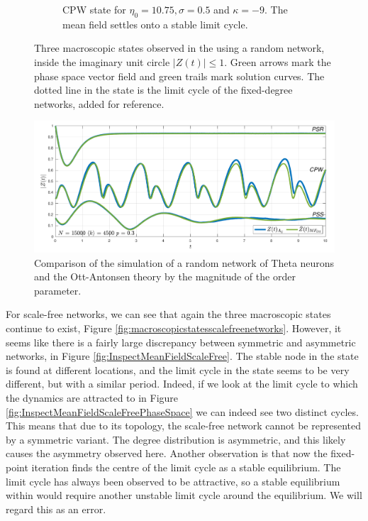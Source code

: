 \begin{figure}[H]
\begin{subfigure}[b]{0.32\linewidth}
   \caption{CPW state for $\eta_0 = 10.75, \sigma = 0.5$ and $\kappa= -9$. The mean field settles onto a stable limit cycle.}
   \label{fig:MFOARCPW_random}
\end{subfigure}
   \caption{Three macroscopic states observed in the \MFR using a random network, inside the imaginary unit circle $|Z(t)| \leqslant 1$. Green arrows mark the phase space vector field and green trails mark solution curves. The dotted line in the \CPW state is the limit cycle of the fixed-degree networks, added for reference.}
   \label{fig:macroscopicstatesrandomnetworks}
\end{figure}

\begin{figure}[H]
\centering
\includegraphics[width = \textwidth, trim={0 3mm 0 3mm},clip]{../Figures/InspectMeanFieldRandom.pdf}
\caption{Comparison of the simulation of a random network of Theta neurons and the Ott-Antonsen theory by the magnitude of the order parameter. }
\label{fig:InspectMeanFieldRandom}
\end{figure}

For scale-free networks, we can see that again the three macroscopic states continue to exist, Figure \ref{fig:macroscopicstatesscalefreenetworks}. However, it seems like there is a fairly large discrepancy between symmetric and asymmetric networks, in Figure \ref{fig:InspectMeanFieldScaleFree}. The stable node in the \PSR state is found at different locations, and the limit cycle in the \CPW state seems to be very different, but with a similar period. Indeed, if we look at the limit cycle to which the dynamics are attracted to in Figure \ref{fig:InspectMeanFieldScaleFreePhaseSpace} we can indeed see two distinct cycles. \\

This means that due to its topology, the scale-free network cannot be represented by a symmetric variant. The degree distribution is asymmetric, and this likely causes the asymmetry observed here. Another observation is that now the fixed-point iteration finds the centre of the limit cycle as a stable equilibrium. The limit cycle has always been observed to be attractive, so a stable equilibrium within would require another unstable limit cycle around the equilibrium. We will regard this as an error.

